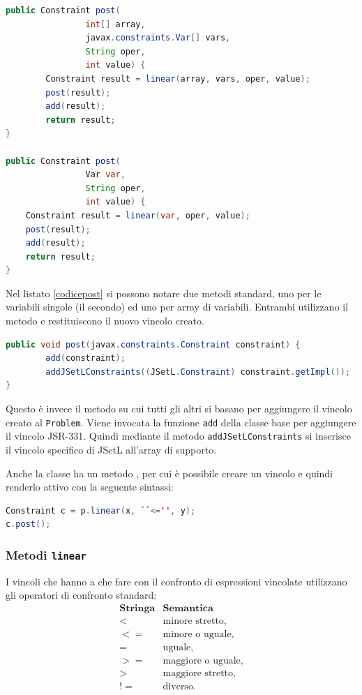 \begin{lstlisting}[language = Java,
                   caption = {\files{post}.},
                   label = codicepost]
public Constraint post(
                int[] array, 
                javax.constraints.Var[] vars, 
                String oper, 
                int value) {
        Constraint result = linear(array, vars, oper, value);
        post(result);
        add(result);
        return result;
}

public Constraint post(
                Var var, 
                String oper, 
                int value) {
	Constraint result = linear(var, oper, value);
	post(result);
	add(result);
	return result;
}
\end{lstlisting}
Nel listato \ref{codicepost} si possono notare due metodi  
standard, uno per le 
variabili singole (il secondo) ed uno per array di variabili. Entrambi 
utilizzano il metodo  e restituiscono il nuovo vincolo
creato. 

\begin{lstlisting}[language = Java,
                   caption = {\files{post(Constraint)}.}]
public void post(javax.constraints.Constraint constraint) {
        add(constraint);
        addJSetLConstraints((JSetL.Constraint) constraint.getImpl());
}
\end{lstlisting}
Questo è invece il metodo su cui tutti gli altri si basano per aggiungere
il vincolo creato al \texttt{Problem}. Viene invocata la funzione \texttt{add}
della classe base per aggiungere il vincolo JSR-331. Quindi mediante il
metodo \texttt{addJSetLConstraints} si inserisce il vincolo specifico di
JSetL all'array di supporto.
\begin{flushleft}
Anche la classe  ha un metodo , per cui è 
possibile creare un vincolo e quindi renderlo attivo con la seguente sintassi:
\begin{lstlisting}[language = Java, frame = single]
Constraint c = p.linear(x, ``<='', y);
c.post();
\end{lstlisting}
\end{flushleft}

\subsubsection{Metodi \texttt{linear}}\label{metLinear}
I vincoli che hanno a che fare con il confronto di espressioni vincolate
utilizzano gli operatori di confronto standard:
\[
\begin{array}{c|c}
\textbf{Stringa} & \textbf{Semantica} \\
\hline \hline
< & \textrm{minore stretto,} \\
<= & \textrm{minore o uguale,} \\
= & \textrm{uguale,} \\
>= & \textrm{maggiore o uguale,} \\
> & \textrm{maggiore stretto,} \\
!= & \textrm{diverso.} \\
\end{array}
\]

